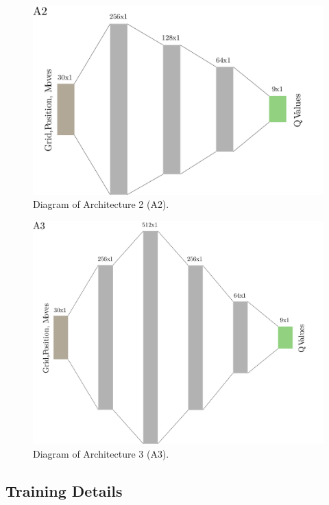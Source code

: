 \documentclass[
  openany]{book}
\begin{document}
\begin{figure}

{\centering \includegraphics[width=0.8\linewidth]{pics/A2} 

}

\caption{Diagram of Architecture 2 (A2).}\label{fig:A2}
\end{figure}



\begin{figure}

{\centering \includegraphics[width=0.8\linewidth]{pics/A3} 

}

\caption{Diagram of Architecture 3 (A3).}\label{fig:A3}
\end{figure}

\hypertarget{training-details}{%
\subsection{Training Details}\label{training-details}}
\end{document}
